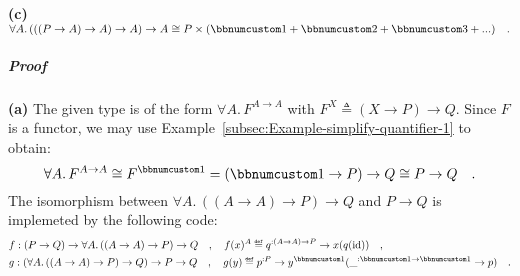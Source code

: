 \textbf{(c)} $\forall A.\,(((P\rightarrow A)\rightarrow A)\rightarrow A)\rightarrow A\cong P\times(\bbnum 1+\bbnum 2+\bbnum 3+...)\quad.$

\subparagraph{Proof}

\textbf{(a)} The given type is of the form $\forall A.\,F^{A\rightarrow A}$
with $F^{X}\triangleq(X\rightarrow P)\rightarrow Q$. Since $F$ is
a functor, we may use Example~\ref{subsec:Example-simplify-quantifier-1}
to obtain: 
\[
\forall A.\,F^{A\rightarrow A}\cong F^{\bbnum 1}=(\bbnum 1\rightarrow P)\rightarrow Q\cong P\rightarrow Q\quad.
\]
The isomorphism between $\forall A.\,((A\rightarrow A)\rightarrow P)\rightarrow Q$
and $P\rightarrow Q$ is implemeted by the following code:
\begin{align*}
 & f:(P\rightarrow Q)\rightarrow\forall A.\,((A\rightarrow A)\rightarrow P)\rightarrow Q\quad,\quad f(x)^{A}\triangleq q^{:(A\rightarrow A)\rightarrow P}\rightarrow x(q(\text{id}))\quad,\\
 & g:(\forall A.\,((A\rightarrow A)\rightarrow P)\rightarrow Q)\rightarrow P\rightarrow Q\quad,\quad g(y)\triangleq p^{:P}\rightarrow y^{\bbnum 1}(\_^{:\bbnum 1\rightarrow\bbnum 1}\rightarrow p)\quad.
\end{align*}

